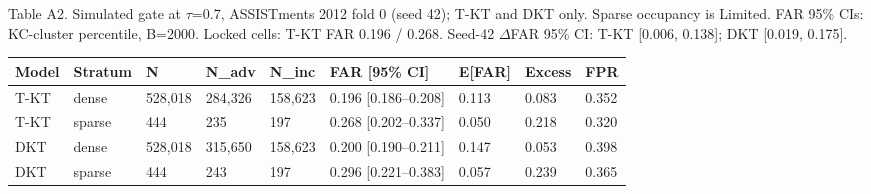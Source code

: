 \documentclass[10pt,a4paper]{article}
\begin{document}
\newpage
\noindent\begin{minipage}{\textwidth}
\centering
{\fontsize{8}{9.5}\selectfont Table A2. Simulated gate at $\tau$=0.7, ASSISTments 2012 fold 0 (seed 42); T-KT and DKT only. Sparse occupancy is Limited. FAR 95\% CIs: KC-cluster percentile, B=2000. Locked cells: T-KT FAR 0.196 / 0.268. Seed-42 $\Delta$FAR 95\% CI: T-KT [0.006, 0.138]; DKT [0.019, 0.175].\par}
\vspace{0.35em}
\begin{adjustbox}{max width=\textwidth}
{\small
\begin{tabular}{@{}lllllllll@{}}
\toprule
Model & Stratum & N & N\_adv & N\_inc & FAR [95\% CI] & E[FAR] & Excess & FPR \\
\midrule
T-KT & dense & 528,018 & 284,326 & 158,623 & 0.196 [0.186--0.208] & 0.113 & 0.083 & 0.352 \\
T-KT & sparse & 444 & 235 & 197 & 0.268 [0.202--0.337] & 0.050 & 0.218 & 0.320 \\
DKT & dense & 528,018 & 315,650 & 158,623 & 0.200 [0.190--0.211] & 0.147 & 0.053 & 0.398 \\
DKT & sparse & 444 & 243 & 197 & 0.296 [0.221--0.383] & 0.057 & 0.239 & 0.365 \\
\bottomrule
\end{tabular}}
\end{adjustbox}
\end{minipage}
\vspace{18pt}
\end{document}
